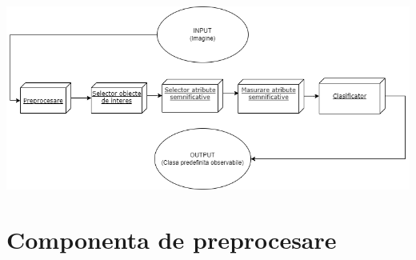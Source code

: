 \documentclass[10pt]{article}
\begin{document}
\includegraphics[scale=0.5]{componente}


\newpage

\section{Componenta de preprocesare}\label{sec:3}
\end{document}

